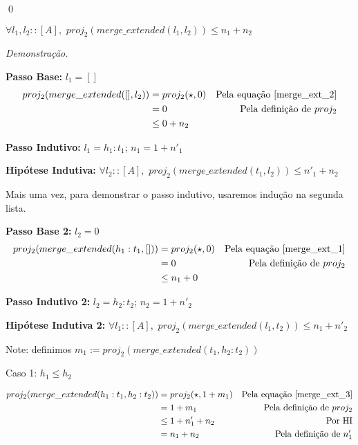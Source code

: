 \documentclass[12pt, oneside, a4paper,english,brazil]{abntex2}
\begin{document}
\qed

\begin{teorema}
  $\forall l_{1}, l_{2} :: [A], \,\, proj_{2}(merge\_extended(l_{1}, l_{2})) \le n_{1} + n_{2}$
\end{teorema}

\noindent \textit{Demonstra\c{c}\~ao.}

\textbf{Passo Base: } $l_{1} = []$
\begin{align*}
  proj_{2}(merge\_extended([], l_{2})) &= proj_{2}(\star, 0) &\text{Pela equa\c{c}\~ao \ref{merge_ext_2}}\\
                                       &= 0 &\text{Pela defini\c{c}\~ao de $proj_{2}$} \\
  &\le 0 + n_{2}
\end{align*}

\textbf{Passo Indutivo: } $l_{1} = h_{1} : t_{1}$; $n_{1} = 1 + n'_{1}$

\textbf{Hip\'otese Indutiva: } $\forall l_{2} :: [A], \,\, proj_{2}(merge\_extended(t_{1}, l_{2})) \le n'_{1} + n_{2}$

Mais uma vez, para demonstrar o passo indutivo, usaremos indu\c{c}\~ao na segunda lista.

\textbf{Passo Base 2: } $l_{2} = 0$
\begin{align*}
  proj_{2}(merge\_extended(h_{1} : t_{1}, [])) &= proj_{2}(\star, 0) &\text{Pela equa\c{c}\~ao \ref{merge_ext_1}}\\
                                               &= 0 &\text{Pela defini\c{c}\~ao de $proj_{2}$} \\
  &\le n_{1} + 0
\end{align*}

\textbf{Passo Indutivo 2: } $l_{2} = h_{2} :  t_{2}$; $n_{2} = 1 + n'_{2}$

\textbf{Hip\'otese Indutiva 2: } $\forall l_{1} :: [A], \,\, proj_{2}(merge\_extended(l_{1}, t_{2})) \le n_{1} + n'_{2}$

Note: definimos $m_{1} := proj_{2}(merge\_extended(t_{1}, h_{2} : t_{2}))$

Caso 1: $h_{1} \le h_{2}$

\begin{align*}
  proj_{2}(merge\_extended(h_{1} : t_{1}, h_{2} : t_{2})) &= proj_{2}(\star, 1 + m_{1}) &\text{Pela equa\c{c}\~ao \ref{merge_ext_3}} \\
                                                          &= 1 + m_{1} &\text{Pela defini\c{c}\~ao de $proj_{2}$} \\
                                                          &\le 1 + n'_{1} + n_{2} &\text{Por HI} \\
  &= n_{1} + n_{2} &\text{Pela defini\c{c}\~ao de $n'_{1}$}
\end{align*}
\end{document}
